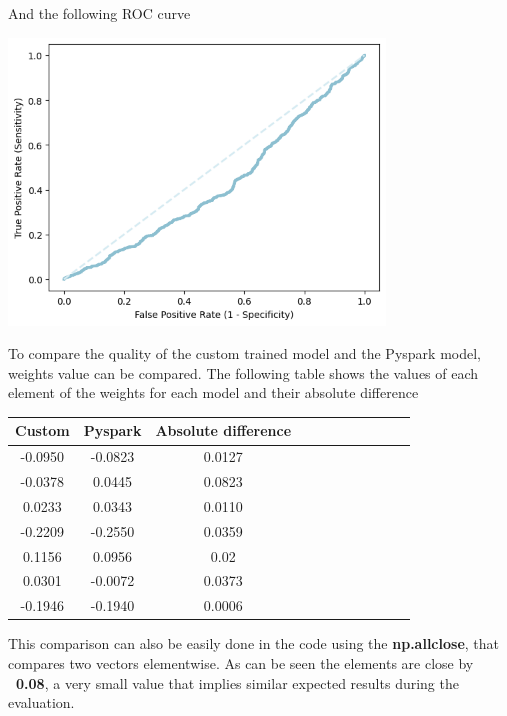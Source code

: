 \documentclass[
	letterpaper, %
	10pt, %
]{class}
\begin{document}
And the following ROC curve

\begin{center}
    \includegraphics[width=10cm]{../images/ml_logistic.png}
\end{center}

To compare the quality of the custom trained model and the Pyspark model, weights value can be compared. The following table shows the values of each element of the weights for each model and their absolute difference

\begin{center}
    \begin{tabular}{ |c|c|c|c|c|c|c|c|c|c|c| }
        \hline
        Custom  & Pyspark & Absolute difference \\
        \hline
        -0.0950 & -0.0823 & 0.0127              \\
        -0.0378 & 0.0445  & 0.0823              \\
        0.0233  & 0.0343  & 0.0110              \\
        -0.2209 & -0.2550 & 0.0359              \\
        0.1156  & 0.0956  & 0.02                \\
        0.0301  & -0.0072 & 0.0373              \\
        -0.1946 & -0.1940 & 0.0006              \\
        \hline
    \end{tabular}
\end{center}

This comparison can also be easily done in the code using the \textbf{np.allclose}, that compares two vectors elementwise.
As can be seen the elements are close by \textbf{~0.08}, a very small value that implies similar expected results during the evaluation.\\
\end{document}
